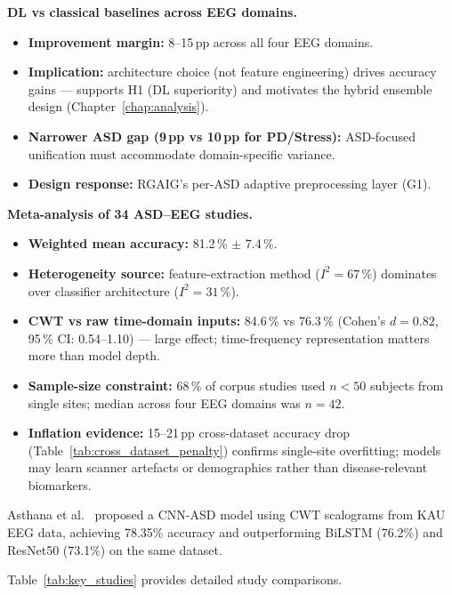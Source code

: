 \noindent\textbf{DL vs classical baselines across EEG domains.}
\begin{itemize}[leftmargin=*, itemsep=2pt]
    \item \textbf{Improvement margin:} 8--15\,pp across all four EEG domains.
    \item \textbf{Implication:} architecture choice (not feature engineering) drives accuracy gains --- supports H1 (DL superiority) and motivates the hybrid ensemble design (Chapter~\ref{chap:analysis}).
    \item \textbf{Narrower ASD gap (9\,pp vs 10\,pp for PD/Stress):} ASD-focused unification must accommodate domain-specific variance.
    \item \textbf{Design response:} RGAIG's per-ASD adaptive preprocessing layer (G1).
\end{itemize}

\noindent\textbf{Meta-analysis of 34 ASD--EEG studies.}
\begin{itemize}[leftmargin=*, itemsep=2pt]
    \item \textbf{Weighted mean accuracy:} 81.2\,\% $\pm$ 7.4\,\%.
    \item \textbf{Heterogeneity source:} feature-extraction method ($I^{2} = 67\,\%$) dominates over classifier architecture ($I^{2} = 31\,\%$).
    \item \textbf{CWT vs raw time-domain inputs:} 84.6\,\% vs 76.3\,\% (Cohen's $d = 0.82$, 95\,\% CI: 0.54--1.10) --- large effect; time-frequency representation matters more than model depth.
    \item \textbf{Sample-size constraint:} 68\,\% of corpus studies used $n < 50$ subjects from single sites; median across four EEG domains was $n = 42$.
    \item \textbf{Inflation evidence:} 15--21\,pp cross-dataset accuracy drop (Table~\ref{tab:cross_dataset_penalty}) confirms single-site overfitting; models may learn scanner artefacts or demographics rather than disease-relevant biomarkers.
\end{itemize}

Asthana et al.~\cite{asthana2025cnnasd_icsit} proposed a CNN-ASD model using CWT scalograms from KAU EEG data, achieving 78.35\% accuracy and outperforming BiLSTM (76.2\%) and ResNet50 (73.1\%) on the same dataset.

Table~\ref{tab:key_studies} provides detailed study comparisons.


